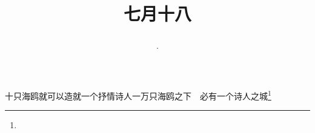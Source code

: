 \title{\date[d=21,m=8,y=2024][year:cn-y,年,month:cn,day:cn,日,·,weekday]·七月十八 }
十只海鸥就可以造就一个抒情诗人一万只海鸥之下　必有一个诗人之城\footnote{ }

